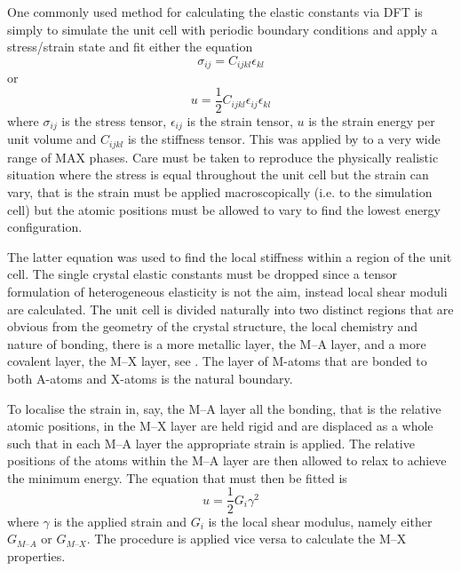 One commonly used method for calculating the elastic constants via DFT is simply to simulate the unit cell with periodic boundary conditions and apply a stress/strain state and fit either the equation
\begin{equation}
\sigma_{ij} = C_{ijkl} \epsilon_{kl}
\end{equation}
or 
\begin{equation}
u = \frac{1}{2} C_{ijkl} \epsilon_{ij} \epsilon_{kl}
\end{equation}
where $\sigma_{ij}$ is the stress tensor, $\epsilon_{ij}$ is the strain tensor, $u$ is the strain energy per unit volume and $C_{ijkl}$ is the stiffness tensor. This was applied by \citet{Aryal2014} to a very wide range of MAX phases. Care must be taken to reproduce the physically realistic situation where the stress is equal throughout the unit cell but the strain can vary, that is the strain must be applied macroscopically (i.e. to the simulation cell) but the atomic positions must be allowed to vary to find the lowest energy configuration.

The latter equation was used to find the local stiffness within a region of the unit cell. The single crystal elastic constants must be dropped since a tensor formulation of heterogeneous elasticity is not the aim, instead local shear moduli are calculated. The unit cell is divided naturally into two distinct regions that are obvious from the geometry of the crystal structure, the local chemistry and nature of bonding, there is a more metallic layer, the M--A layer, and a more covalent layer, the M--X layer, see \label{fig:fig:MAX_unit_cells}. The layer of M-atoms that are bonded to both A-atoms and X-atoms is the natural boundary.

To localise the strain in, say, the M--A layer all the bonding, that is the relative atomic positions, in the M--X layer are held rigid and are displaced as a whole such that in each M--A layer the appropriate strain is applied. The relative positions of the atoms within the M--A layer are then allowed to relax to achieve the minimum energy. The equation that must then be fitted is
\begin{equation}
u = \frac{1}{2} G_{i} \gamma^2
\end{equation}
where $\gamma$ is the applied strain and $G_i$ is the local shear modulus, namely either $G_{M\text{--}A}$ or $G_{M\text{--}X}$. The procedure is applied vice versa to calculate the M--X properties.




